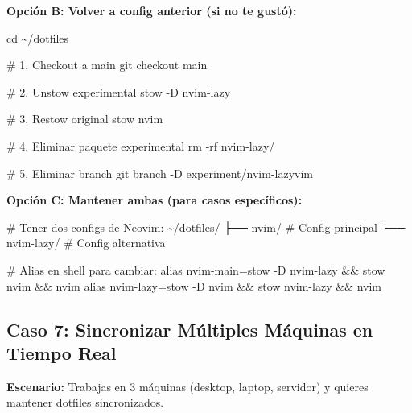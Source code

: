 \documentclass[
  doc,
  floatsintext,
  longtable,
  a4paper,
  nolmodern,
  notxfonts,
  notimes,
  12pt,
  colorlinks=true,linkcolor=blue,citecolor=blue,urlcolor=blue]{apa7}
\newenvironment{Shaded}{\begin{snugshade}}{\end{snugshade}}
\newcommand{\AttributeTok}[1]{\textcolor[rgb]{0.40,0.45,0.13}{#1}}
\newcommand{\BuiltInTok}[1]{\textcolor[rgb]{0.00,0.23,0.31}{#1}}
\newcommand{\CommentTok}[1]{\textcolor[rgb]{0.37,0.37,0.37}{#1}}
\newcommand{\ExtensionTok}[1]{\textcolor[rgb]{0.00,0.23,0.31}{#1}}
\newcommand{\FunctionTok}[1]{\textcolor[rgb]{0.28,0.35,0.67}{#1}}
\newcommand{\NormalTok}[1]{\textcolor[rgb]{0.00,0.23,0.31}{#1}}
\newcommand{\StringTok}[1]{\textcolor[rgb]{0.13,0.47,0.30}{#1}}
\begin{document}
\textbf{Opción B: Volver a config anterior (si no te gustó):}

\begin{Shaded}
\begin{Highlighting}[]
\BuiltInTok{cd}\NormalTok{ \textasciitilde{}/dotfiles}

\CommentTok{\# 1. Checkout a main}
\FunctionTok{git}\NormalTok{ checkout main}

\CommentTok{\# 2. Unstow experimental}
\ExtensionTok{stow} \AttributeTok{{-}D}\NormalTok{ nvim{-}lazy}

\CommentTok{\# 3. Restow original}
\ExtensionTok{stow}\NormalTok{ nvim}

\CommentTok{\# 4. Eliminar paquete experimental}
\FunctionTok{rm} \AttributeTok{{-}rf}\NormalTok{ nvim{-}lazy/}

\CommentTok{\# 5. Eliminar branch}
\FunctionTok{git}\NormalTok{ branch }\AttributeTok{{-}D}\NormalTok{ experiment/nvim{-}lazyvim}
\end{Highlighting}
\end{Shaded}

\textbf{Opción C: Mantener ambas (para casos específicos):}

\begin{Shaded}
\begin{Highlighting}[]
\CommentTok{\# Tener dos configs de Neovim:}
\ExtensionTok{\textasciitilde{}/dotfiles/}
\ExtensionTok{├──}\NormalTok{ nvim/          }\CommentTok{\# Config principal}
\ExtensionTok{└──}\NormalTok{ nvim{-}lazy/     }\CommentTok{\# Config alternativa}

\CommentTok{\# Alias en shell para cambiar:}
\BuiltInTok{alias}\NormalTok{ nvim{-}main=}\StringTok{\textquotesingle{}stow {-}D nvim{-}lazy \&\& stow nvim \&\& nvim\textquotesingle{}}
\BuiltInTok{alias}\NormalTok{ nvim{-}lazy=}\StringTok{\textquotesingle{}stow {-}D nvim \&\& stow nvim{-}lazy \&\& nvim\textquotesingle{}}
\end{Highlighting}
\end{Shaded}

\subsection{Caso 7: Sincronizar Múltiples Máquinas en Tiempo
Real}\label{caso-7-sincronizar-muxfaltiples-muxe1quinas-en-tiempo-real}

\textbf{Escenario:} Trabajas en 3 máquinas (desktop, laptop, servidor) y
quieres mantener dotfiles sincronizados.
\end{document}
